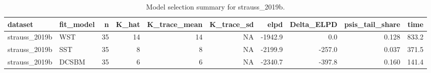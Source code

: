 \begin{table}

\caption{\label{tab:tab:model_selection_strauss_2019b}Model selection summary for strauss_2019b.}
\centering
\begin{tabular}[t]{llrrrrrrrr}
\toprule
dataset & fit\_model & n & K\_hat & K\_trace\_mean & K\_trace\_sd & elpd & Delta\_ELPD & psis\_tail\_share & time\\
\midrule
strauss\_2019b & WST & 35 & 14 & 14 & NA & -1942.9 & 0.0 & 0.128 & 833.2\\
strauss\_2019b & SST & 35 & 8 & 8 & NA & -2199.9 & -257.0 & 0.037 & 371.5\\
strauss\_2019b & DCSBM & 35 & 6 & 6 & NA & -2340.7 & -397.8 & 0.160 & 141.4\\
\bottomrule
\end{tabular}
\end{table}
